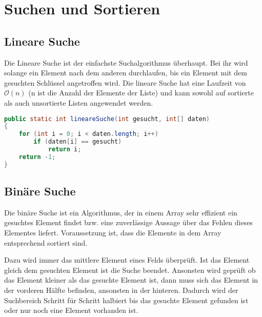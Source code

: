 \chapter{Suchen und Sortieren}
\section{Lineare Suche}
\label{sec:lineareSuche}
Die Lineare Suche ist der einfachste Suchalgorithmus überhaupt.
Bei ihr wird solange ein Element nach dem anderen durchlaufen, bis ein Element mit dem gesuchten Schlüssel angetroffen wird.
Die lineare Suche hat eine Laufzeit von $\mathcal{O}(n)$ (n ist die Anzahl der Elemente der Liste) und kann sowohl auf sortierte als auch unsortierte Listen angewendet werden. 
\begin{lstlisting}[language=java, caption={Beispielimplementierung in Java}]
public static int lineareSuche(int gesucht, int[] daten)
{
    for (int i = 0; i < daten.length; i++)
        if (daten[i] == gesucht)
            return i;
    return -1;
}
\end{lstlisting}

\section{Binäre Suche}
\label{sec:binaereSuche}
Die binäre Suche ist ein Algorithmus, der in einem Array sehr effizient ein gesuchtes Element findet bzw. eine zuverlässige Aussage über das Fehlen dieses Elementes liefert.
Voraussetzung ist, dass die Elemente in dem Array entsprechend sortiert sind.

Dazu wird immer das mittlere Element eines Felds überprüft.
Ist das Element gleich dem gesuchten Element ist die Suche beendet.
Ansonsten wird geprüft ob das Element kleiner als das gesuchte Element ist, dann muss sich das Element in der vorderen Hälfte befinden, ansonsten in der hinteren.
Dadurch wird der Suchbereich Schritt für Schritt halbiert bis das gesuchte Element gefunden ist oder nur noch eine Element vorhanden ist.

